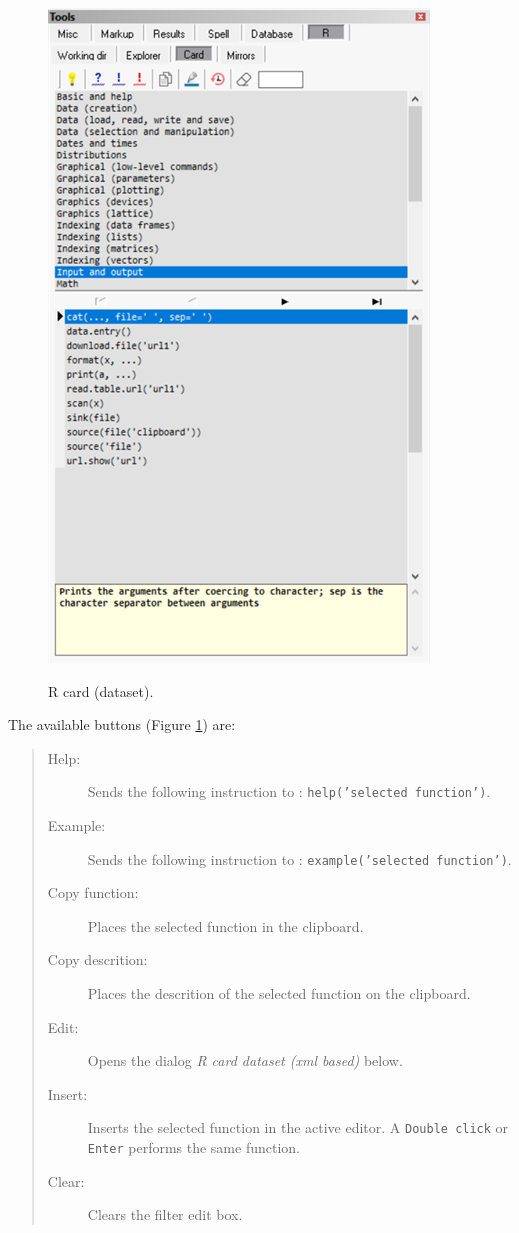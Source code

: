 \begin{figure}[H]
  \includegraphics[scale=0.6]{./res/tools_r_card.png}\\
  \caption{R card (dataset).}
  \label{fig:tools_r_card}
\end{figure}

The available buttons
(Figure \ref{fig:tools_r_card})
are:

\begin{quote}
  \begin{footnotesize}
    \begin{description}
      \item[Help:]
        Sends the following instruction to \RR{}: \texttt{help('selected function')}.
      \item[Example:]
        Sends the following instruction to \RR{}: \texttt{example('selected function')}.
      \item[Copy function:]
        Places the selected function in the clipboard.
      \item[Copy descrition:]
        Places the descrition of the selected function on the clipboard.
      \item[Edit:]
        Opens the dialog \textit{R card dataset (xml based)} below.
      \item[Insert:]
        Inserts the selected function in the active editor. A
        \texttt{Double click} or \texttt{Enter} performs the same function.
      \item [Clear:]
        Clears the filter edit box.
    \end{description}
  \end{footnotesize}
\end{quote}

